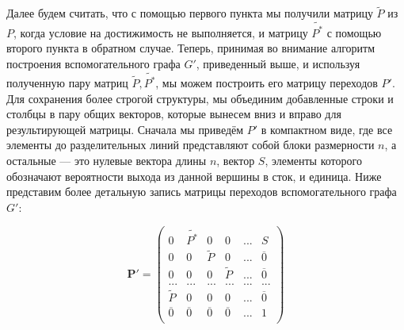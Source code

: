 	Далее будем считать, что с помощью первого пункта мы получили матрицу $\tilde{P}$ из $P$, когда условие на достижимость не выполняется, и матрицу $\tilde{P^*}$ с помощью второго пункта в обратном случае. Теперь, принимая во внимание алгоритм построения вспомогательного графа $G'$, приведенный выше, и используя полученную пару матриц $\tilde{P}, \tilde{P^*}$, мы можем построить его матрицу переходов $P'$. Для сохранения более строгой структуры, мы объединим добавленные строки и столбцы в пару общих векторов, которые вынесем вниз и вправо для результирующей матрицы. Сначала мы приведём $P'$ в компактном виде, где все элементы до разделительных линий представляют собой блоки размерности $n$, а остальные --- это нулевые вектора длины $n$, вектор $S$, элементы которого обозначают вероятности выхода из данной вершины в сток, и единица. Ниже представим более детальную запись матрицы переходов вспомогательного графа $G'$:
	
	\begin{displaymath}
		\mathbf{P'} =
		\left( \begin{array}{ccccc|c}
		0 & \tilde{P^*} & 0 & 0 & ... & S \\
		0 & 0 & \tilde{P} & 0 & ... & \overline 0 \\
		0 & 0 & 0 & \tilde{P} & ... & \overline 0 \\
		... & ... & ... & ... & ... & ... \\
		\tilde{P} & 0 & 0 & 0 & ... & \overline 0 \\
		\hline
		\overline 0 & \overline 0 & \overline 0 & \overline 0 & ... & 1 \\
		\end{array} \right)
	\end{displaymath}
	
